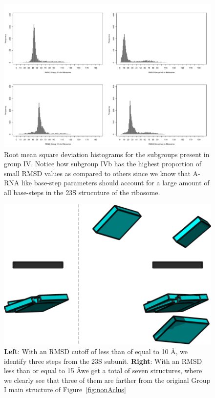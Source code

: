 \begin{figure}[htbp]
 \centering
\includegraphics[angle=90, scale=0.6]{Chapter2/RMSDschneider2.png}
\caption{Root mean square deviation histograms for the subgroups
  present in group IV. Notice how subgroup IVb has the highest
  proportion of small RMSD values as compared to others since we know
  that A-RNA like base-step parameters should account for a large
  amount of all base-steps in the 23S strucuture of the ribosome.}
 \label{fig:histo2}
\end{figure}

\begin{figure}[htp]
 \centering
\includegraphics[angle=0, scale=0.3]{Chapter2/G1at10_15.png}
\caption{\textbf{Left}: With an RMSD cutoff of less than of equal to
  10 \AA, we identify three steps from the 23S subunit. \textbf{Right}:
  With an RMSD less than or equal to 15 \AA we get a total of seven
  structures, where we clearly see that three of them are farther from
the original Group I main structure of Figure~\ref{fig:nonAclus}}
 \label{fig:superimpose}
\end{figure}

